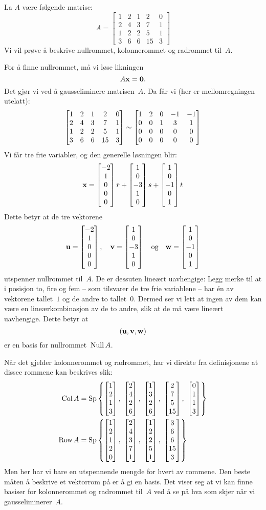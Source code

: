 \begin{ex}
La $A$ være følgende matrise:
\[
A =
\begin{bmatrix}
1 & 2 & 1 &  2 & 0 \\
2 & 4 & 3 &  7 & 1 \\
1 & 2 & 2 &  5 & 1 \\
3 & 6 & 6 & 15 & 3
\end{bmatrix}
\]
Vi vil prøve å beskrive nullrommet, kolonnerommet og radrommet
til~$A$.

For å finne nullrommet, må vi løse likningen
\[
A \mathbf{x} = \mathbf{0}.
\]
Det gjør vi ved å gausseliminere matrisen~$A$.  Da får vi (her er
mellomregningen utelatt):
\[
\begin{bmatrix}
1 & 2 & 1 &  2 & 0 \\
2 & 4 & 3 &  7 & 1 \\
1 & 2 & 2 &  5 & 1 \\
3 & 6 & 6 & 15 & 3
\end{bmatrix}
\sim
\begin{bmatrix}
1 & 2 & 0 & -1 & -1 \\
0 & 0 & 1 &  3 & 1 \\
0 & 0 & 0 &  0 & 0 \\
0 & 0 & 0 &  0 & 0
\end{bmatrix}
\]
Vi får tre frie variabler, og den generelle løsningen blir:
\[
\mathbf{x} = \begin{bmatrix} -2 \\ 1 \\ 0 \\ 0 \\ 0 \end{bmatrix} r +
     \begin{bmatrix} 1 \\ 0 \\ -3 \\ 1 \\ 0 \end{bmatrix} s +
     \begin{bmatrix} 1 \\ 0 \\ -1 \\ 0 \\ 1 \end{bmatrix} t
\]
Dette betyr at de tre vektorene
\[
\mathbf{u} = \begin{bmatrix} -2 \\ 1 \\ 0 \\ 0 \\ 0 \end{bmatrix},\quad
\mathbf{v} = \begin{bmatrix} 1 \\ 0 \\ -3 \\ 1 \\ 0 \end{bmatrix}\quad
\text{og}\quad
\mathbf{w} = \begin{bmatrix} 1 \\ 0 \\ -1 \\ 0 \\ 1 \end{bmatrix}
\]
utspenner nullrommet til~$A$.  De er dessuten lineært uavhengige: Legg
merke til at i posisjon to, fire og fem -- som tilsvarer de tre frie
variablene -- har én av vektorene tallet~$1$ og de andre to
tallet~$0$.  Dermed ser vi lett at ingen av dem kan være en
lineærkombinasjon av de to andre, slik at de må være lineært
uavhengige.  Dette betyr at
\[
(\mathbf{u}, \mathbf{v}, \mathbf{w})
\]
er en basis for nullrommet~$\operatorname{Null} A$.

Når det gjelder kolonnerommet og radrommet, har vi direkte fra
definisjonene at dissee rommene kan beskrives slik:
\begin{align*}
\Col A &=
\Sp \left\{
\vvvv{1}{2}{1}{3},\ %
\vvvv{2}{4}{2}{6},\ %
\vvvv{1}{3}{2}{6},\ %
\vvvv{2}{7}{5}{15},\ %
\vvvv{0}{1}{1}{3}
\right\}
\\
\Row A &=
\Sp \left\{
\vvvvv{1}{2}{1}{ 2}{0},\ %
\vvvvv{2}{4}{3}{ 7}{1},\ %
\vvvvv{1}{2}{2}{ 5}{1},\ %
\vvvvv{3}{6}{6}{15}{3}
\right\}
\end{align*}
Men her har vi bare en utspennende mengde for hvert av rommene.  Den
beste måten å beskrive et vektorrom på er å gi en basis.  Det viser
seg at vi kan finne basiser for kolonnerommet og radrommet til~$A$ ved
å se på hva som skjer når vi gausseliminerer~$A$.


\end{ex}
